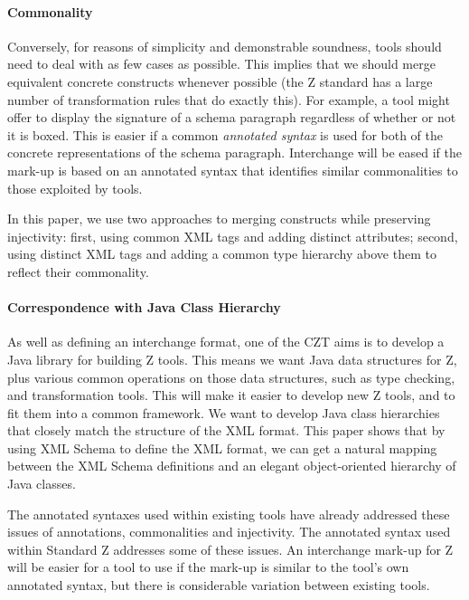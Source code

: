 \documentclass{llncs}  %
\begin{document}
\paragraph{Commonality}
Conversely, for reasons of simplicity and demonstrable soundness, 
tools should need to deal with as few cases as possible.  This implies
that we should merge equivalent concrete constructs whenever possible
(the Z standard has a large number of transformation rules that do
exactly this).
For example, a tool might offer to display the signature 
of a schema paragraph regardless of whether or not it is boxed.
This is easier if a common \textit{annotated syntax} is used
for both of the concrete representations of the schema paragraph.
Interchange will be eased if the mark-up is based on an annotated syntax
that identifies similar commonalities to those exploited by tools.

In this paper, we use two approaches to merging constructs while preserving
injectivity: first, using common XML tags and adding distinct attributes;
second, using distinct XML tags and adding a common type hierarchy above
them to reflect their commonality.

\paragraph{Correspondence with Java Class Hierarchy}
As well as defining an interchange format, one of the CZT 
aims is to develop a Java library for building Z tools.  
This means we want Java data structures for Z, plus various
common operations on those data structures, such as type checking,
and transformation tools.  This will make it easier to develop new
Z tools, and to fit them into a common framework.
We want to develop Java class hierarchies
that closely match the structure of the XML format.  
This paper shows that by using XML Schema to define the XML format,
we can get a natural mapping between the XML Schema definitions and
an elegant object-oriented hierarchy of Java classes.

\vspace{1.5ex}

The annotated syntaxes used within existing tools have already
addressed these issues of annotations, commonalities and injectivity.
The annotated syntax used within Standard Z addresses some of these issues.
An interchange mark-up for Z will be easier for a tool to use
if the mark-up is similar to the tool's own annotated syntax,
but there is considerable variation between existing tools. 
\end{document}
